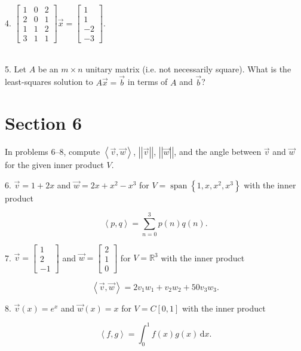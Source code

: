 \documentclass{article}
\begin{document}
4. $\left[\begin{array}{ccc} 1& 0& 2 \\ 2& 0& 1 \\ 1& 1& 2 \\ 3& 1& 1 \end{array}\right]\vec{x} = \left[\begin{array}{c} 1 \\ 1 \\ -2 \\ -3 \end{array}\right]$.

~\\

5. Let $A$ be an $m \times n$ unitary matrix (i.e. not necessarily square). What is the least-squares solution to $A\vec{x} = \vec{b}$ in terms of $A$ and $\vec{b}$?

\section{Section 6}

In problems 6--8, compute $\left< \vec{v}, \vec{w} \right>$, $\left| \left| \vec{v} \right| \right|$, $\left| \left| \vec{w} \right| \right|$, and the angle between $\vec{v}$ and $\vec{w}$ for the given inner product $V$.

6. $\vec{v} = 1 + 2x$ and $\vec{w} = 2x + x^2 - x^3$ for $V = \operatorname{span}\left\{ 1, x, x^2, x^3 \right\}$ with the inner product

$$
	\left< p, q \right> = \sum_{n = 0}^3 p(n)q(n).
$$

7. $\vec{v} = \left[\begin{array}{c} 1 \\ 2 \\ -1 \end{array}\right]$ and $\vec{w} = \left[\begin{array}{c} 2 \\ 1 \\ 0 \end{array}\right]$ for $V = \mathbb{R}^3$ with the inner product

$$
	\left< \vec{v}, \vec{w} \right> = 2v_1w_1 + v_2w_2 + 50v_3w_3.
$$

8. $\vec{v}(x) = e^x$ and $\vec{w}(x) = x$ for $V = C[0, 1]$ with the inner product

$$
	\left< f, g \right> = \int_0^1 f(x)g(x)\,\text{d} x.
$$

~\\
\end{document}
